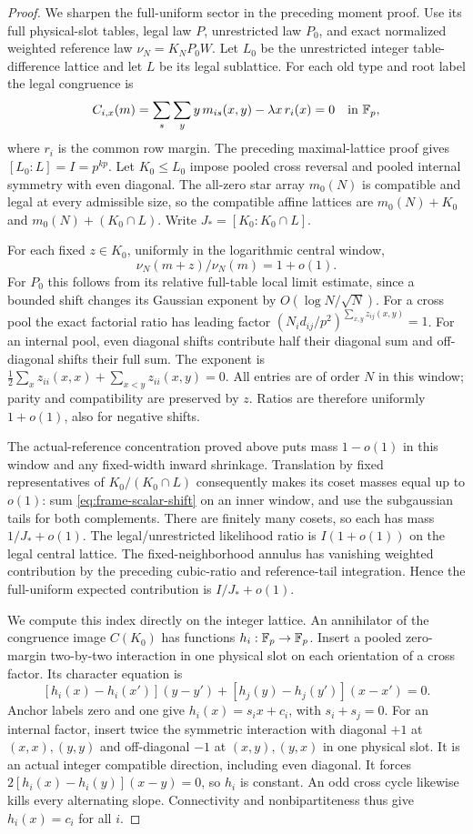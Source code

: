 \begin{proof}
We sharpen the full-uniform sector in the preceding moment proof.
Use its full physical-slot tables, legal law $P$, unrestricted law $P_0$,
and exact normalized weighted reference law $\nu_N=K_NP_0W$.
Let $L_0$ be the unrestricted integer table-difference lattice and let
$L$ be its legal sublattice. For each old type and root label the legal
congruence is
\[
 C_{i,x}(m)=\sum_s\sum_y y\,m_{is}(x,y)-\lambda x\,r_i(x)=0
 \quad\text{in }\mathbb F_p,
\]
where $r_i$ is the common row margin. The preceding maximal-lattice
proof gives $[L_0:L]=I=p^{kp}$. Let $K_0\le L_0$ impose pooled
cross reversal and pooled internal symmetry with even diagonal.
The all-zero star array $m_0(N)$ is compatible and legal at every
admissible size, so the compatible affine lattices are
$m_0(N)+K_0$ and $m_0(N)+(K_0\cap L)$. Write
$J_*=[K_0:K_0\cap L]$.

For each fixed $z\in K_0$, uniformly in the logarithmic central window,
\begin{equation}\label{eq:frame-scalar-shift}
 \nu_N(m+z)/\nu_N(m)=1+o(1).
\end{equation}
For $P_0$ this follows from its relative full-table local limit
estimate, since a bounded shift changes its Gaussian exponent by
$O(\log N/\sqrt N)$. For a cross pool the exact factorial ratio has
leading factor $(N_id_{ij}/p^2)^{\sum_{x,y}z_{ij}(x,y)}=1$.
For an internal pool, even diagonal shifts contribute half their
diagonal sum and off-diagonal shifts their full sum. The exponent is
$\frac12\sum_xz_{ii}(x,x)+\sum_{x<y}z_{ii}(x,y)=0$.
All entries are of order $N$ in this window; parity and compatibility
are preserved by $z$. Ratios are therefore uniformly $1+o(1)$,
also for negative shifts.

The actual-reference concentration proved above puts mass $1-o(1)$
in this window and any fixed-width inward shrinkage. Translation by
fixed representatives of $K_0/(K_0\cap L)$ consequently makes its
coset masses equal up to $o(1)$: sum
\eqref{eq:frame-scalar-shift} on an inner window, and use the
subgaussian tails for both complements. There are finitely many
cosets, so each has mass $1/J_*+o(1)$. The legal/unrestricted
likelihood ratio is $I(1+o(1))$ on the legal central lattice.
The fixed-neighborhood annulus has vanishing weighted contribution
by the preceding cubic-ratio and reference-tail integration.
Hence the full-uniform expected contribution is $I/J_*+o(1)$.

We compute this index directly on the integer lattice. An annihilator
of the congruence image $C(K_0)$ has functions $h_i:\mathbb F_p\to\mathbb F_p$.
Insert a pooled zero-margin two-by-two interaction in one physical
slot on each orientation of a cross factor. Its character equation is
\[
 [h_i(x)-h_i(x')](y-y')+
 [h_j(y)-h_j(y')](x-x')=0.
\]
Anchor labels zero and one give $h_i(x)=s_ix+c_i$, with
$s_i+s_j=0$. For an internal factor, insert twice the symmetric
interaction with diagonal $+1$ at $(x,x),(y,y)$ and off-diagonal
$-1$ at $(x,y),(y,x)$ in one physical slot. It is an actual
integer compatible direction, including even diagonal. It forces
$2[h_i(x)-h_i(y)](x-y)=0$, so $h_i$ is constant.
An odd cross cycle likewise kills every alternating slope.
Connectivity and nonbipartiteness thus give $h_i(x)=c_i$ for all $i$.


\end{proof}
